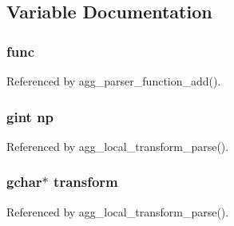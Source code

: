 \subsection{Variable Documentation}
\subsubsection[{func}]{ func}\label{transform_8c_aff7c1eae5750eecdd39d132f24f15135}


Referenced by agg\+\_\+parser\+\_\+function\+\_\+add().

\subsubsection[{np}]{\setlength{\rightskip}{0pt plus 5cm}gint np}\label{transform_8c_a96ca1086cda152ba0935e179cda8d77a}


Referenced by agg\+\_\+local\+\_\+transform\+\_\+parse().

\subsubsection[{transform}]{\setlength{\rightskip}{0pt plus 5cm}gchar$\ast$ transform}\label{transform_8c_af2af92fbcf6e919143b320c5258aed0c}


Referenced by agg\+\_\+local\+\_\+transform\+\_\+parse().

